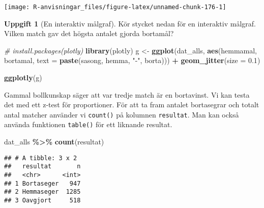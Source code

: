 \documentclass[
]{book}
\newenvironment{Shaded}{\begin{snugshade}}{\end{snugshade}}
\newcommand{\AttributeTok}[1]{\textcolor[rgb]{0.13,0.29,0.53}{#1}}
\newcommand{\CommentTok}[1]{\textcolor[rgb]{0.56,0.35,0.01}{\textit{#1}}}
\newcommand{\FloatTok}[1]{\textcolor[rgb]{0.00,0.00,0.81}{#1}}
\newcommand{\FunctionTok}[1]{\textcolor[rgb]{0.13,0.29,0.53}{\textbf{#1}}}
\newcommand{\NormalTok}[1]{#1}
\newcommand{\OtherTok}[1]{\textcolor[rgb]{0.56,0.35,0.01}{#1}}
\newcommand{\SpecialCharTok}[1]{\textcolor[rgb]{0.81,0.36,0.00}{\textbf{#1}}}
\newcommand{\StringTok}[1]{\textcolor[rgb]{0.31,0.60,0.02}{#1}}
\theoremstyle{definition}
\theoremstyle{definition}
\theoremstyle{definition}
\newtheorem{exercise}{Uppgift}[chapter]
\theoremstyle{definition}
\theoremstyle{remark}
\begin{document}
\begin{center}\texttt{[image: R-anvisningar\_files/figure-latex/unnamed-chunk-176-1]} \end{center}

\begin{exercise}[En interaktiv målgraf]

Kör stycket nedan för en interaktiv målgraf. Vilken match gav det högsta antalet gjorda bortamål?

\begin{Shaded}
\begin{Highlighting}[]
\CommentTok{\# install.packages(plotly)}
\FunctionTok{library}\NormalTok{(plotly)}
\NormalTok{g }\OtherTok{\textless{}{-}} \FunctionTok{ggplot}\NormalTok{(dat\_alls, }\FunctionTok{aes}\NormalTok{(hemmamal, bortamal, }\AttributeTok{text =} \FunctionTok{paste}\NormalTok{(sasong, hemma, }\StringTok{"{-}"}\NormalTok{, borta))) }\SpecialCharTok{+}
  \FunctionTok{geom\_jitter}\NormalTok{(}\AttributeTok{size =} \FloatTok{0.1}\NormalTok{)}

\FunctionTok{ggplotly}\NormalTok{(g)}
\end{Highlighting}
\end{Shaded}

\end{exercise}

Gammal bollkunskap säger att var tredje match är en bortavinst. Vi kan testa det med ett z-test för proportioner. För att ta fram antalet bortasegrar och totalt antal matcher använder vi \texttt{count()} på kolumnen \texttt{resultat}. Man kan också använda funktionen \texttt{table()} för ett liknande resultat.

\begin{Shaded}
\begin{Highlighting}[]
\NormalTok{dat\_alls }\SpecialCharTok{\%\textgreater{}\%} \FunctionTok{count}\NormalTok{(resultat)}
\end{Highlighting}
\end{Shaded}

\begin{verbatim}
## # A tibble: 3 x 2
##   resultat       n
##   <chr>      <int>
## 1 Bortaseger   947
## 2 Hemmaseger  1285
## 3 Oavgjort     518
\end{verbatim}

\begin{Shaded}
\end{Shaded}
\end{document}
